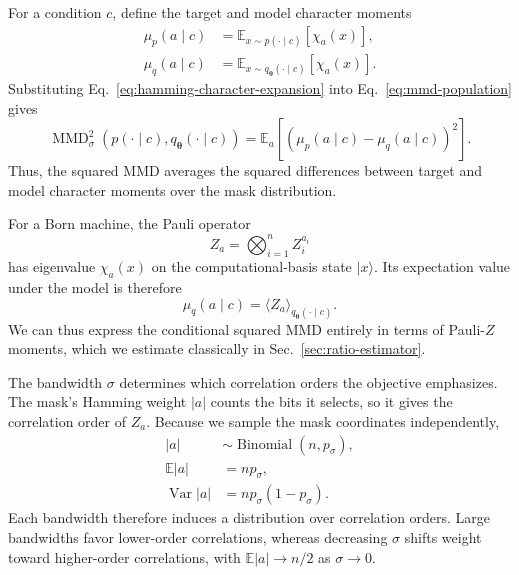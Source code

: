 \documentclass[pra,aps,10pt,twocolumn,floatfix,superscriptaddress, notitlepage,longbibliography]{revtex4-2}
\newcommand{\E}{\mathbb{E}}
\newcommand{\mmd}{\operatorname{MMD}}
\begin{document}
For a condition $c$, define the target and model character moments
\begin{equation}
\begin{aligned}
    \mu_p(a\mid c)
    &=
    \E_{x\sim p(\cdot\mid c)}
    [\chi_a(x)],\\
    \mu_q(a\mid c)
    &=
    \E_{x\sim q_{\boldsymbol{\theta}}(\cdot\mid c)}
    [\chi_a(x)].
\end{aligned}
\label{eq:conditional-character-moments}
\end{equation}
Substituting Eq.~\eqref{eq:hamming-character-expansion} into Eq.~\eqref{eq:mmd-population} gives
\begin{equation}
    \mmd_\sigma^2
    \!\left(
        p(\cdot\mid c),
        q_{\boldsymbol{\theta}}(\cdot\mid c)
    \right)
    =
    \E_a
    \!\left[
        \left(
            \mu_p(a\mid c)-\mu_q(a\mid c)
        \right)^2
    \right].
    \label{eq:mmd-character-moments}
\end{equation}
Thus, the squared MMD averages the squared differences between target and model character moments over the mask distribution.

For a Born machine, the Pauli operator
\begin{equation}
    Z_a=\bigotimes_{i=1}^{n}Z_i^{a_i}
\end{equation}
has eigenvalue $\chi_a(x)$ on the computational-basis state $|x\rangle$. Its expectation value under the model is therefore
\begin{equation}
    \mu_q(a\mid c)
    =
    \langle Z_a\rangle_{q_{\boldsymbol{\theta}}(\cdot\mid c)}.
    \label{eq:model-character-pauli}
\end{equation}
We can thus express the conditional squared MMD entirely in terms of Pauli-$Z$ moments, which we estimate classically in Sec.~\ref{sec:ratio-estimator}.

The bandwidth $\sigma$ determines which correlation orders the objective emphasizes. The mask's Hamming weight $|a|$ counts the bits it selects, so it gives the correlation order of $Z_a$. Because we sample the mask coordinates independently,
\begin{equation}
\begin{aligned}
    |a|&\sim\operatorname{Binomial}(n,p_\sigma),\\
    \E|a|&=np_\sigma,\\
    \operatorname{Var}|a|&=np_\sigma(1-p_\sigma).
\end{aligned}
\label{eq:mmd-bodyness-distribution}
\end{equation}
Each bandwidth therefore induces a distribution over correlation orders. Large bandwidths favor lower-order correlations, whereas decreasing $\sigma$ shifts weight toward higher-order correlations, with $\E|a|\rightarrow n/2$ as $\sigma\rightarrow0$.
\end{document}
